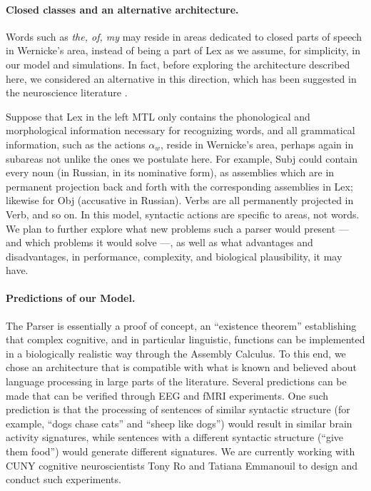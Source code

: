 \documentclass[11pt,a4paper]{article}
\begin{document}
\paragraph{Closed classes and an alternative architecture.}  Words such as {\em the, of, my} may reside in areas dedicated to closed parts of speech in Wernicke's area, instead of being a part of {\sc Lex} as we assume, for simplicity, in our model and simulations. In fact, before exploring the architecture described here, we considered an alternative in this direction, which has been suggested in the neuroscience literature 
\cite{Rolls2015}.  

Suppose that {\sc Lex} in the left MTL only contains the phonological and morphological information necessary for recognizing words, and all grammatical information, such as the actions $\alpha_w$, reside in Wernicke's area, perhaps again in subareas not unlike the ones we postulate here.  For example, {\sc Subj} could contain every noun (in Russian, in its nominative form), as assemblies which are in permanent projection back and forth with the corresponding assemblies in {\sc Lex}; likewise for {\sc Obj} (accusative in Russian).  Verbs are all permanently projected in {\sc Verb}, and so on.  In this model, syntactic actions are specific to areas, not words.  We plan to further explore what new problems such a parser would present --- and which problems it would solve ---, as well as what advantages and disadvantages, in performance, complexity, and biological plausibility, it may have. 

\paragraph{Predictions of our Model.}  \label{predictions}
The Parser is essentially a proof of concept, an ``existence theorem'' establishing that complex cognitive, and in particular linguistic, functions can be implemented in a biologically realistic way through the Assembly Calculus.  To this end, we chose an architecture that is compatible with what is known and believed about language processing in large parts of the literature.  Several predictions can be made that can be verified through EEG and fMRI experiments.  One such prediction is that the processing of sentences of similar syntactic structure (for example, ``dogs chase cats'' and ``sheep like dogs'') would result in similar brain activity signatures, while sentences with a different syntactic structure (``give them food'') would generate different signatures.  We are currently working with CUNY cognitive neuroscientists Tony Ro and Tatiana Emmanouil to design and conduct such experiments. 
\end{document}
